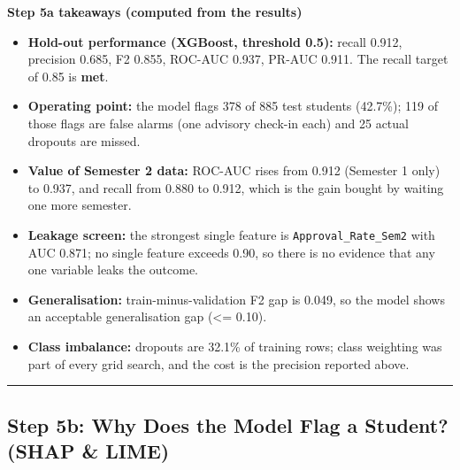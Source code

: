 \documentclass[11pt]{article}
\providecommand{\tightlist}{%
      \setlength{\itemsep}{0pt}\setlength{\parskip}{0pt}}
\begin{document}
    \textbf{Step 5a takeaways (computed from the results)}

\begin{itemize}
\tightlist
\item
  \textbf{Hold-out performance (XGBoost, threshold 0.5):} recall 0.912,
  precision 0.685, F2 0.855, ROC-AUC 0.937, PR-AUC 0.911. The recall
  target of 0.85 is \textbf{met}.
\item
  \textbf{Operating point:} the model flags 378 of 885 test students
  (42.7\%); 119 of those flags are false alarms (one advisory check-in
  each) and 25 actual dropouts are missed.
\item
  \textbf{Value of Semester 2 data:} ROC-AUC rises from 0.912 (Semester
  1 only) to 0.937, and recall from 0.880 to 0.912, which is the gain
  bought by waiting one more semester.
\item
  \textbf{Leakage screen:} the strongest single feature is
  \texttt{Approval\_Rate\_Sem2} with AUC 0.871; no single feature
  exceeds 0.90, so there is no evidence that any one variable leaks the
  outcome.
\item
  \textbf{Generalisation:} train-minus-validation F2 gap is 0.049, so
  the model shows an acceptable generalisation gap (\textless= 0.10).
\item
  \textbf{Class imbalance:} dropouts are 32.1\% of training rows; class
  weighting was part of every grid search, and the cost is the precision
  reported above.
\end{itemize}

    
    \begin{center}\rule{0.5\linewidth}{0.5pt}\end{center}

\hypertarget{step-5b-why-does-the-model-flag-a-student-shap-lime}{%
\subsection{Step 5b: Why Does the Model Flag a Student? (SHAP \&
LIME)}\label{step-5b-why-does-the-model-flag-a-student-shap-lime}}
\end{document}
